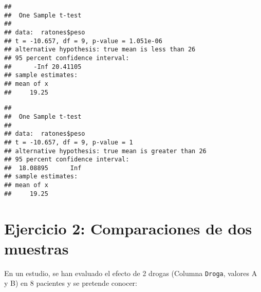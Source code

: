 \documentclass[
]{article}
\newenvironment{Shaded}{}{}
\newcommand{\AttributeTok}[1]{\textcolor[rgb]{0.49,0.56,0.16}{#1}}
\newcommand{\CommentTok}[1]{\textcolor[rgb]{0.38,0.63,0.69}{\textit{#1}}}
\newcommand{\DecValTok}[1]{\textcolor[rgb]{0.25,0.63,0.44}{#1}}
\newcommand{\FunctionTok}[1]{\textcolor[rgb]{0.02,0.16,0.49}{#1}}
\newcommand{\NormalTok}[1]{#1}
\newcommand{\SpecialCharTok}[1]{\textcolor[rgb]{0.25,0.44,0.63}{#1}}
\newcommand{\StringTok}[1]{\textcolor[rgb]{0.25,0.44,0.63}{#1}}
\begin{document}
\begin{Shaded}
\end{Shaded}

\begin{verbatim}
## 
##  One Sample t-test
## 
## data:  ratones$peso
## t = -10.657, df = 9, p-value = 1.051e-06
## alternative hypothesis: true mean is less than 26
## 95 percent confidence interval:
##      -Inf 20.41105
## sample estimates:
## mean of x 
##     19.25
\end{verbatim}

\begin{Shaded}
\end{Shaded}

\begin{verbatim}
## 
##  One Sample t-test
## 
## data:  ratones$peso
## t = -10.657, df = 9, p-value = 1
## alternative hypothesis: true mean is greater than 26
## 95 percent confidence interval:
##  18.08895      Inf
## sample estimates:
## mean of x 
##     19.25
\end{verbatim}

\hypertarget{ejercicio-2-comparaciones-de-dos-muestras}{%
\section{\texorpdfstring{\textbf{Ejercicio 2: Comparaciones de dos
muestras}}{Ejercicio 2: Comparaciones de dos muestras}}\label{ejercicio-2-comparaciones-de-dos-muestras}}

En un estudio, se han evaluado el efecto de 2 drogas (Columna
\texttt{Droga}, valores A y B) en 8 pacientes y se pretende conocer:
\end{document}
